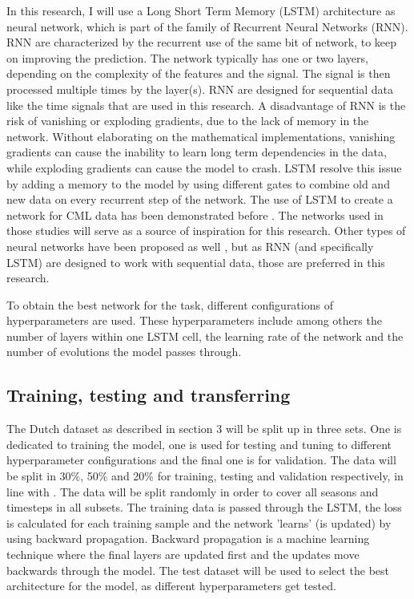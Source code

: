 \documentclass[twocolumn, 10pt, a4paper]{article}
\begin{document}
	In this research, I will use a Long Short Term Memory (LSTM) architecture as neural network, which is part of the family of Recurrent Neural Networks (RNN). RNN are characterized by the recurrent use of the same bit of network, to keep on improving the prediction. The network typically has one or two layers, depending on the complexity of the features and the signal. The signal is then processed multiple times by the layer(s). RNN are designed for sequential data like the time signals that are used in this research. A disadvantage of RNN is the risk of vanishing or exploding gradients, due to the lack of memory in the network. Without elaborating on the mathematical implementations, vanishing gradients can cause the inability to learn long term dependencies in the data, while exploding gradients can cause the model to crash. LSTM resolve this issue by adding a memory to the model by using different gates to combine old and new data on every recurrent step of the network. The use of LSTM to create a network for CML data has been demonstrated before . The networks used in those studies will serve as a source of inspiration for this research. Other types of neural networks have been proposed as well , but as RNN (and specifically LSTM) are designed to work with sequential data, those are preferred in this research.
	
	To obtain the best network for the task, different configurations of hyperparameters are used. These hyperparameters include among others the number of layers within one LSTM cell, the learning rate of the network and the number of evolutions the model passes through.
	
	\subsection{Training, testing and transferring}
	The  Dutch dataset as described in section 3 will be split up in three sets. One is dedicated to training the model, one is used for testing and tuning to different hyperparameter configurations and the final one is for validation. The data will be split in 30\%, 50\% and 20\% for training, testing and validation respectively, in line with . The data will be split randomly in order to cover all seasons and timesteps in all subsets. 
	The training data is passed through the LSTM, the loss is calculated for each training sample and the network 'learns' (is updated) by using backward propagation. Backward propagation is a machine learning technique where the final layers are updated first and the updates move backwards through the model. The test dataset will be used to select the best architecture for the model, as different hyperparameters get tested.
	
\end{document}
